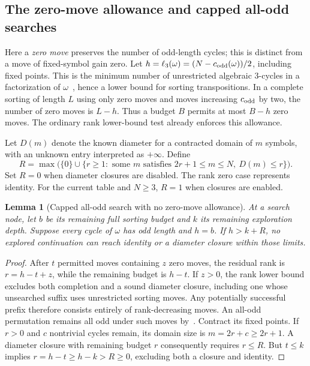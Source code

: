 \documentclass[11pt,a4paper]{article}
\newtheorem{lemma}{Lemma}
\begin{document}
\subsection{The zero-move allowance and capped all-odd searches}
Here a \emph{zero move} preserves the number of odd-length cycles; this is
distinct from a move of fixed-symbol gain zero. Let
$h=\ell_3(\omega)=(N-c_{\rm odd}(\omega))/2$, including fixed points.
This is the minimum number of unrestricted algebraic $3$-cycles in a
factorization of $\omega$~\cite[Proposition 3.1]{muhle-nadeau}, hence a
lower bound for sorting transpositions. In a complete sorting of length $L$
using only zero moves and moves increasing $c_{\rm odd}$ by two, the number
of zero moves is $L-h$. Thus a budget $B$ permits at most $B-h$ zero moves.
The ordinary rank lower-bound test already enforces this allowance.

Let $D(m)$ denote the known diameter for a contracted domain of $m$ symbols,
with an unknown entry interpreted as $+\infty$. Define
\[
 R=\max\bigl(\{0\}\cup
 \{r\geq1:\text{ some }m\text{ satisfies }2r+1\leq m\leq N,
                                      \ D(m)\leq r\}\bigr).
\]
Set $R=0$ when diameter closures are disabled. The rank zero case represents
identity. For the current table and $N\geq3$, $R=1$ when closures are enabled.

\begin{lemma}[Capped all-odd search with no zero-move allowance]
At a search node, let $b$ be its remaining full sorting budget and $k$ its
remaining exploration depth. Suppose every cycle of $\omega$ has odd length
and $h=b$. If $h>k+R$, no explored continuation can reach identity or a
diameter closure within those limits.
\end{lemma}
\begin{proof}
After $t$ permitted moves containing $z$ zero moves, the residual rank is
$r=h-t+z$, while the remaining budget is $h-t$. If $z>0$, the rank lower
bound excludes both completion and a sound diameter closure, including one
whose unsearched suffix uses unrestricted sorting moves. Any potentially
successful prefix therefore consists entirely of rank-decreasing moves.
An all-odd permutation remains all odd under such moves
by~\cite[Corollary 3.3 and Remark 3.5]{muhle-nadeau}.
Contract its fixed points. If $r>0$ and $c$ nontrivial cycles remain, its
domain size is $m=2r+c\geq2r+1$. A diameter closure with remaining budget
$r$ consequently requires $r\leq R$. But $t\leq k$ implies
$r=h-t\geq h-k>R\geq0$, excluding both a closure and identity.
\end{proof}
\end{document}
